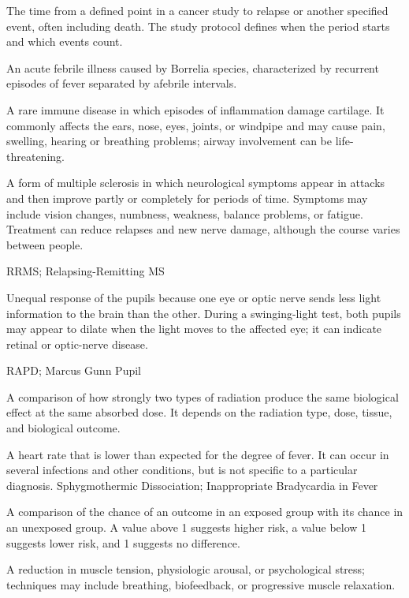  The time from a defined point in a cancer study to relapse or another specified event, often including death. The study protocol defines when the period starts and which events count.

 An acute febrile illness caused by Borrelia species, characterized by recurrent episodes
of fever separated by afebrile intervals.

 A rare immune disease in which episodes of inflammation damage cartilage. It commonly affects the ears, nose, eyes, joints, or windpipe and may cause pain, swelling, hearing or breathing problems; airway involvement can be life-threatening.

 A form of multiple sclerosis in which neurological symptoms appear in attacks and then improve partly or completely for periods of time. Symptoms may include vision changes, numbness, weakness, balance problems, or fatigue. Treatment can reduce relapses and new nerve damage, although the course varies between people.

\synonyms
RRMS; Relapsing-Remitting MS

 Unequal response of the pupils because one eye or optic nerve sends less light information to the brain than the other. During a swinging-light test, both pupils may appear to dilate when the light moves to the affected eye; it can indicate retinal or optic-nerve disease.

\synonyms
RAPD; Marcus Gunn Pupil

 A comparison of how strongly two types of radiation produce the same biological effect at the same absorbed dose. It depends on the radiation type, dose, tissue, and biological outcome.

 A heart rate that is lower than expected for the degree of fever. It can occur in several infections and other conditions, but is not specific to a particular diagnosis.
\synonyms
Sphygmothermic Dissociation; Inappropriate Bradycardia in Fever

 A comparison of the chance of an outcome in an exposed group with its chance in an unexposed group. A value above 1 suggests higher risk, a value below 1 suggests lower risk, and 1 suggests no difference.

 A reduction in muscle tension, physiologic arousal, or psychological stress; techniques may include breathing, biofeedback, or progressive muscle relaxation.

